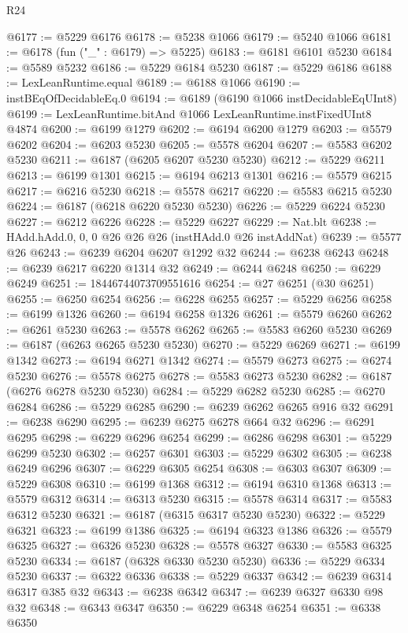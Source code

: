\begin{lexlean}{R24}
\begin{coremodule}
@6177 := @5229 @6176
@6178 := @5238 @1066
@6179 := @5240 @1066
@6181 := @6178 (fun ("_" : @6179) => @5225)
@6183 := @6181 @6101 @5230
@6184 := @5589 @5232
@6186 := @5229 @6184 @5230
@6187 := @5229 @6186
@6188 := LexLeanRuntime.equal
@6189 := @6188 @1066
@6190 := instBEqOfDecidableEq.{0}
@6194 := @6189 (@6190 @1066 instDecidableEqUInt8)
@6199 := LexLeanRuntime.bitAnd @1066 LexLeanRuntime.instFixedUInt8 @4874
@6200 := @6199 @1279
@6202 := @6194 @6200 @1279
@6203 := @5579 @6202
@6204 := @6203 @5230
@6205 := @5578 @6204
@6207 := @5583 @6202 @5230
@6211 := @6187 (@6205 @6207 @5230 @5230)
@6212 := @5229 @6211
@6213 := @6199 @1301
@6215 := @6194 @6213 @1301
@6216 := @5579 @6215
@6217 := @6216 @5230
@6218 := @5578 @6217
@6220 := @5583 @6215 @5230
@6224 := @6187 (@6218 @6220 @5230 @5230)
@6226 := @5229 @6224 @5230
@6227 := @6212 @6226
@6228 := @5229 @6227
@6229 := Nat.blt
@6238 := HAdd.hAdd.{0, 0, 0} @26 @26 @26 (instHAdd.{0} @26 instAddNat)
@6239 := @5577 @26
@6243 := @6239 @6204 @6207 @1292 @32
@6244 := @6238 @6243
@6248 := @6239 @6217 @6220 @1314 @32
@6249 := @6244 @6248
@6250 := @6229 @6249
@6251 := 18446744073709551616
@6254 := @27 @6251 (@30 @6251)
@6255 := @6250 @6254
@6256 := @6228 @6255
@6257 := @5229 @6256
@6258 := @6199 @1326
@6260 := @6194 @6258 @1326
@6261 := @5579 @6260
@6262 := @6261 @5230
@6263 := @5578 @6262
@6265 := @5583 @6260 @5230
@6269 := @6187 (@6263 @6265 @5230 @5230)
@6270 := @5229 @6269
@6271 := @6199 @1342
@6273 := @6194 @6271 @1342
@6274 := @5579 @6273
@6275 := @6274 @5230
@6276 := @5578 @6275
@6278 := @5583 @6273 @5230
@6282 := @6187 (@6276 @6278 @5230 @5230)
@6284 := @5229 @6282 @5230
@6285 := @6270 @6284
@6286 := @5229 @6285
@6290 := @6239 @6262 @6265 @916 @32
@6291 := @6238 @6290
@6295 := @6239 @6275 @6278 @664 @32
@6296 := @6291 @6295
@6298 := @6229 @6296 @6254
@6299 := @6286 @6298
@6301 := @5229 @6299 @5230
@6302 := @6257 @6301
@6303 := @5229 @6302
@6305 := @6238 @6249 @6296
@6307 := @6229 @6305 @6254
@6308 := @6303 @6307
@6309 := @5229 @6308
@6310 := @6199 @1368
@6312 := @6194 @6310 @1368
@6313 := @5579 @6312
@6314 := @6313 @5230
@6315 := @5578 @6314
@6317 := @5583 @6312 @5230
@6321 := @6187 (@6315 @6317 @5230 @5230)
@6322 := @5229 @6321
@6323 := @6199 @1386
@6325 := @6194 @6323 @1386
@6326 := @5579 @6325
@6327 := @6326 @5230
@6328 := @5578 @6327
@6330 := @5583 @6325 @5230
@6334 := @6187 (@6328 @6330 @5230 @5230)
@6336 := @5229 @6334 @5230
@6337 := @6322 @6336
@6338 := @5229 @6337
@6342 := @6239 @6314 @6317 @385 @32
@6343 := @6238 @6342
@6347 := @6239 @6327 @6330 @98 @32
@6348 := @6343 @6347
@6350 := @6229 @6348 @6254
@6351 := @6338 @6350

\end{coremodule}
\end{lexlean}
